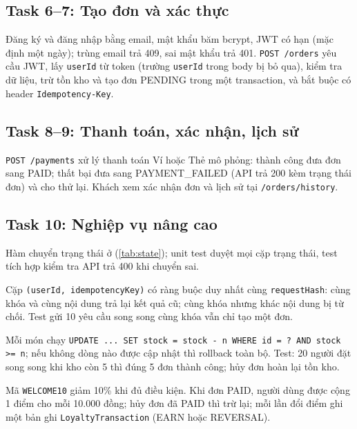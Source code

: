 \subsection{Task 6--7: Tạo đơn và xác thực}
Đăng ký và đăng nhập bằng email, mật khẩu băm bcrypt, JWT có hạn (mặc định một ngày); trùng email trả 409, sai mật khẩu trả 401. \texttt{POST /orders} yêu cầu JWT, lấy \texttt{userId} từ token (trường \texttt{userId} trong body bị bỏ qua), kiểm tra dữ liệu, trừ tồn kho và tạo đơn PENDING trong một transaction, và bắt buộc có header \texttt{Idempotency-Key}.

\subsection{Task 8--9: Thanh toán, xác nhận, lịch sử}
\texttt{POST /payments} xử lý thanh toán Ví hoặc Thẻ mô phỏng: thành công đưa đơn sang PAID; thất bại đưa sang PAYMENT\_FAILED (API trả 200 kèm trạng thái đơn) và cho thử lại. Khách xem xác nhận đơn và lịch sử tại \texttt{/orders/history}.

\subsection{Task 10: Nghiệp vụ nâng cao}
\begin{description}[leftmargin=0pt,style=nextline]
\item[Máy trạng thái đơn.] Hàm chuyển trạng thái ở  (\cref{tab:state}); unit test duyệt mọi cặp trạng thái, test tích hợp kiểm tra API trả 400 khi chuyển sai.
\item[Idempotency.] Cặp \texttt{(userId, idempotencyKey)} có ràng buộc duy nhất cùng \texttt{requestHash}: cùng khóa và cùng nội dung trả lại kết quả cũ; cùng khóa nhưng khác nội dung bị từ chối. Test gửi 10 yêu cầu song song cùng khóa vẫn chỉ tạo một đơn.
\item[Tồn kho đồng thời.] Mỗi món chạy \texttt{UPDATE ... SET stock = stock - n WHERE id = ? AND stock >= n}; nếu không dòng nào được cập nhật thì rollback toàn bộ. Test: 20 người đặt song song khi kho còn 5 thì đúng 5 đơn thành công; hủy đơn hoàn lại tồn kho.
\item[Khuyến mãi và điểm thưởng.] Mã \texttt{WELCOME10} giảm 10\% khi đủ điều kiện. Khi đơn PAID, người dùng được cộng 1 điểm cho mỗi 10.000 đồng; hủy đơn đã PAID thì trừ lại; mỗi lần đổi điểm ghi một bản ghi \texttt{LoyaltyTransaction} (EARN hoặc REVERSAL).
\end{description}

